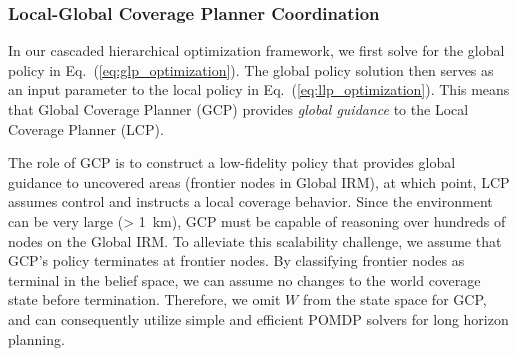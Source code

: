 \documentclass[letterpaper]{article} %
\newcommand{\phdone}[1]{} %
\begin{document}
\subsubsection{Local-Global Coverage Planner Coordination} \hfill

\noindent
In our cascaded hierarchical optimization framework, we first solve for the global policy in Eq.~(\ref{eq:glp_optimization}). The global policy solution then serves as an input parameter to the local policy in Eq.~(\ref{eq:llp_optimization}). This means that Global Coverage Planner (GCP) provides \textit{global guidance} to the Local Coverage Planner (LCP).





The role of GCP is to construct a low-fidelity policy that provides global guidance to uncovered areas (frontier nodes in Global IRM), at which point, LCP assumes control and instructs a local coverage behavior. Since the environment can be very large (> 1~km), GCP must be capable of reasoning over hundreds of nodes on the Global IRM. To alleviate this scalability challenge, we assume that GCP's policy terminates at frontier nodes. By classifying frontier nodes as terminal in the belief space, we can assume no changes to the world coverage state before termination. Therefore, we omit $W$ from the state space for GCP, and can consequently utilize simple and efficient POMDP solvers for long horizon planning.

\end{document}
